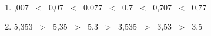    \ \\ [-5mm]
   \begin{enumerate}
      \item {},007 \, < \, 0,07 \, < \, 0,077 \, < \, 0,7 \, < \, 0,707 \, < \, 0,77 \smallskip
      \item 5,353 \, > \, 5,35 \, > \, 5,3 \, > \, 3,535 \, > \, 3,53 \, > \, 3,5
   \end{enumerate}

